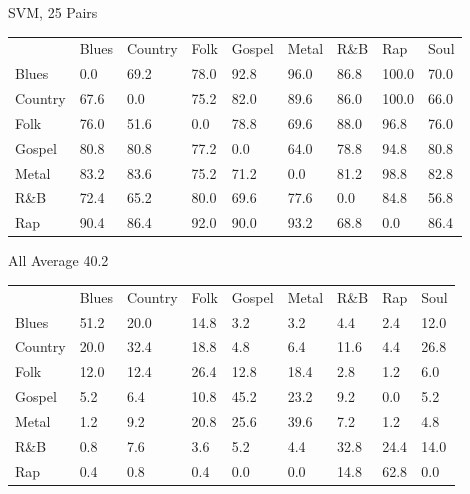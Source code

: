 \documentclass[a4paper,oneside]{article}
\begin{document}
SVM, 25
Pairs
\begin{table}
\begin{tabular}{|l||*{8}{l|}} \hline
 & Blues & Country & Folk & Gospel & Metal & R\&B & Rap & Soul \\ \hhline{|=||*{8}{=|}}
Blues & 0.0 & 69.2 & 78.0 & 92.8 & 96.0 & 86.8 & 100.0 & 70.0 \\ \hline
Country & 67.6 & 0.0 & 75.2 & 82.0 & 89.6 & 86.0 & 100.0 & 66.0 \\ \hline
Folk & 76.0 & 51.6 & 0.0 & 78.8 & 69.6 & 88.0 & 96.8 & 76.0 \\ \hline
Gospel & 80.8 & 80.8 & 77.2 & 0.0 & 64.0 & 78.8 & 94.8 & 80.8 \\ \hline
Metal & 83.2 & 83.6 & 75.2 & 71.2 & 0.0 & 81.2 & 98.8 & 82.8 \\ \hline
R\&B & 72.4 & 65.2 & 80.0 & 69.6 & 77.6 & 0.0 & 84.8 & 56.8 \\ \hline
Rap & 90.4 & 86.4 & 92.0 & 90.0 & 93.2 & 68.8 & 0.0 & 86.4 \\ \hline
\end{tabular}
\end{table}

All
Average 40.2
\begin{table}
\begin{tabular}{|l||*{8}{l|}} \hline
 & Blues & Country & Folk & Gospel & Metal & R\&B & Rap & Soul \\ \hhline{|=||*{8}{=|}}
Blues & 51.2 & 20.0 & 14.8 & 3.2 & 3.2 & 4.4 & 2.4 & 12.0 \\ \hline
Country & 20.0 & 32.4 & 18.8 & 4.8 & 6.4 & 11.6 & 4.4 & 26.8 \\ \hline
Folk & 12.0 & 12.4 & 26.4 & 12.8 & 18.4 & 2.8 & 1.2 & 6.0 \\ \hline
Gospel & 5.2 & 6.4 & 10.8 & 45.2 & 23.2 & 9.2 & 0.0 & 5.2 \\ \hline
Metal & 1.2 & 9.2 & 20.8 & 25.6 & 39.6 & 7.2 & 1.2 & 4.8 \\ \hline
R\&B & 0.8 & 7.6 & 3.6 & 5.2 & 4.4 & 32.8 & 24.4 & 14.0 \\ \hline
Rap & 0.4 & 0.8 & 0.4 & 0.0 & 0.0 & 14.8 & 62.8 & 0.0 \\ \hline
\end{tabular}
\end{table}
\end{document}
